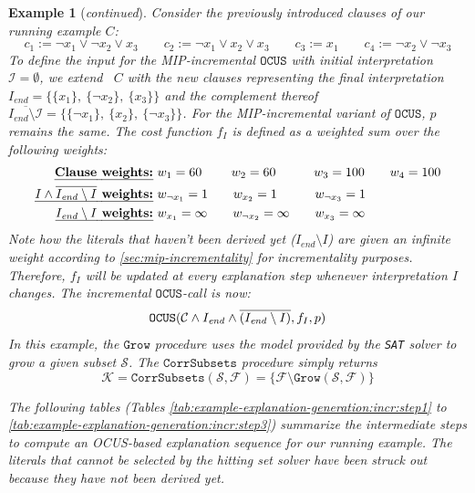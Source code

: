 \documentclass[twoside,11pt]{article}
\newcommand\m[1]{\mathcal{#1}}
\newtheorem{example}{Example}
\newcommand\comment[1]{\marginpar{\tiny #1}}
\renewcommand\comment[1]{#1}
\newcommand{\tias}[1]{{\comment{\color{blue}Tias:#1}}}
\newcommand\Iend{\ensuremath{I_\mathit{end} }\xspace}
\newcommand\formula{\ensuremath{\m{F} }\xspace}
\newcommand\formulac{\ensuremath{\m{C} }\xspace}
\newcommand\formularunning{\ensuremath{C }\xspace}
\newcommand\mm[1]{\ensuremath{#1}\xspace}
\newcommand\call[1]{\mm{\texttt{#1}}}
\newcommand\sat{\texttt{{SAT}}\xspace}
\newcommand\grow{\mm{\call{Grow}}}
\newcommand\comus{\mm{\call{OCUS}}}
\newcommand\corrsubsets{\mm{\call{CorrSubsets}}}
\begin{document}
\begin{example}[\textit{continued}]\label{ex:ocus-incr:expl-seq} 
	Consider the previously introduced clauses of our running example $\formularunning$: 
	 \[ c_1 := \lnot x_1 \vee \lnot x_2 \vee x_3 \qquad  c_2 := \lnot x_1 \vee  x_2 \vee x_3 \qquad  c_3 := x_1 \qquad c_4 := \lnot x_2 \vee \lnot x_3 \]
	To define the input for the MIP-incremental \comus with initial interpretation $\m{I}=\emptyset$, we extend~ $\formularunning$ with the new clauses representing the final interpretation $\Iend =  \{ \{ x_1\},\  \{\lnot x_2\},\ \{ x_3\}\}$ and the complement thereof $\overline{\Iend \setminus \m{I}} =  \{ \{\lnot x_1\},\    \{ x_2\}, \   \{\lnot x_3\}\}$.
	For the MIP-incremental variant of \comus, $p$ remains the same. The cost function $f_I $ is defined as a weighted sum over the following weights:
	\begin{align*}
	\text{\textbf{\emph{Clause weights:}}} & \ w_1 = 60 \  \qquad w_2=60  \qquad  \ \ \ w_3=100 \qquad w_4=100 \\
	\text{\textbf{\emph{$I \wedge \overline{\Iend \setminus I}$ weights:}}}& \  w_{\lnot x_1}=1  \qquad w_{ x_2}=1 \ \ \ \qquad w_{\lnot x_3}=1 \\
	\text{\textbf{\emph{$\Iend \setminus I$ weights:}}}& \  w_{x_1}=\infty  \qquad w_{\lnot x_2}=\infty \qquad w_{x_3}=\infty
	\end{align*}
	Note how the literals that haven't been derived yet ($\Iend \setminus I$) are given an infinite weight according to \cref{sec:mip-incrementality} for incrementality purposes.
	Therefore, $f_I$ will be updated at every explanation step whenever interpretation $I$ changes.
	The incremental \comus-call is now: 	
	\begin{equation}
	\comus( \formulac\land \textbf{\Iend} \land \overline{(\Iend\setminus I)}, f_I, p)		
	\end{equation}
	In this example, the $\grow$ procedure uses the model provided by the \sat solver to grow a given subset $\m{S}$. %
	The \corrsubsets procedure simply returns
	\begin{equation} 
		\m{K} = \corrsubsets(\m{S}, \formula) = \{\formula \setminus \grow(\m{S}, \formula)\}
			\end{equation}

 The following tables (Tables \ref{tab:example-explanation-generation:incr:step1} to \ref{tab:example-explanation-generation:incr:step3}) summarize the intermediate steps to compute an OCUS-based explanation sequence for our running example. 
The literals that cannot be selected by the hitting set solver have been struck out because they have not been derived yet. 


\end{example}
\end{document}
